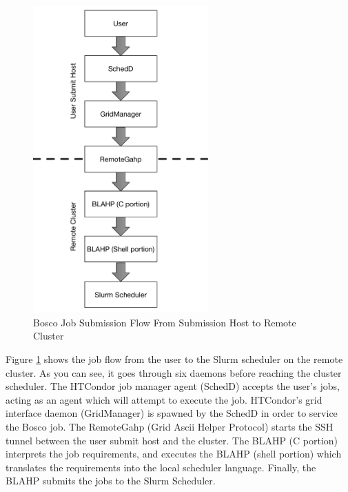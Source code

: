 \begin{figure}[h!t]
	\centering
	\includegraphics[width=0.6\textwidth]{images/JobSubmitFlow.pdf}
	\caption{Bosco Job Submission Flow From Submission Host to Remote Cluster}
	\label{fig:boscojobsubmitflow}
\end{figure}

Figure \ref{fig:boscojobsubmitflow} shows the job flow from the user to the Slurm scheduler on the remote cluster.  As you can see, it goes through six daemons before reaching the cluster scheduler.  The HTCondor job manager agent (SchedD) accepts the user's jobs, acting as an agent which will attempt to execute the job.  HTCondor's grid interface daemon (GridManager) is spawned by the SchedD in order to service the Bosco job.  The RemoteGahp (Grid Ascii Helper Protocol) starts the SSH tunnel between the user submit host and the cluster.  The BLAHP (C portion) interprets the job requirements, and executes the BLAHP (shell portion) which translates the requirements into the local scheduler language.  Finally, the BLAHP submits the jobs to the Slurm Scheduler.

